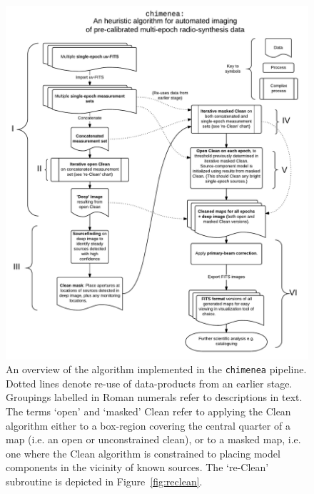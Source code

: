 \documentclass[5p,authoryear]{elsarticle}
\begin{document}
\begin{figure}[p!]
\begin{center}  
  \includegraphics[width=.96\textwidth]{../figures/chimenea-flow-bold-labels}
  \caption[Overview of \texttt{chimenea} logic]{%
An overview of the algorithm implemented in the \texttt{chimenea} pipeline.
Dotted lines denote re-use of data-products from an earlier stage. 
Groupings labelled in Roman numerals refer to descriptions in text.
The terms `open' and `masked' Clean refer to applying the Clean
algorithm \citep{Schwab1984} either to a box-region covering the central quarter of a map (i.e. an open or unconstrained clean), or to a masked map, i.e. one where the Clean algorithm is constrained to placing model components in the vicinity of known sources.
The `re-Clean' subroutine is depicted in Figure~\ref{fig:reclean}.
\label{fig:chimenea}
} 
\end{center} 
\end{figure}
\end{document}
